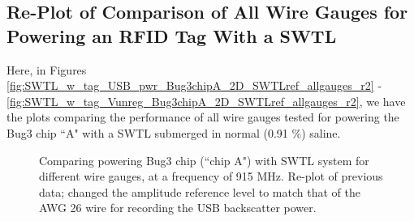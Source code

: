 \documentclass[12pt,onecolumn,titlepage]{article}
\begin{document}
\subsection{Re-Plot of Comparison of All Wire Gauges for Powering an RFID Tag With a SWTL}
\indent \indent Here, in Figures \ref{fig:SWTL_w_tag_USB_pwr_Bug3chipA_2D_SWTLref_allgauges_r2} - \ref{fig:SWTL_w_tag_Vunreg_Bug3chipA_2D_SWTLref_allgauges_r2}, we have the plots comparing the performance of all wire gauges tested for powering the Bug3 chip ``A" with a SWTL submerged in normal (0.91 \%) saline.




\begin{figure}[htbp]
	\centering
		\quad
		
	\label{fig:SWTL_w_tag_2D_SWTLref_allgauges_replot}
	\caption{Comparing powering Bug3 chip (``chip A") with SWTL system for different wire gauges, at a frequency of 915 MHz. Re-plot of previous data; changed the amplitude reference level to match that of the AWG 26 wire for recording the USB backscatter power.}
\end{figure}
\end{document}
